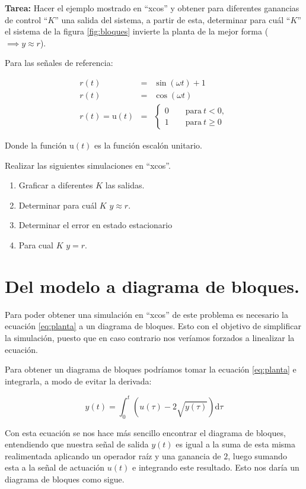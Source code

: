 \documentclass[11pt,a4paper]{article}
\begin{document}
\textbf{Tarea:} Hacer el ejemplo mostrado en ``xcos'' y obtener para diferentes ganancias de control ``$K$'' una salida del sistema, a partir de esta, determinar para cuál ``$K$'' el sistema de la figura \ref{fig:bloques} invierte la planta de la mejor forma ($\implies y \approx r$).

Para las señales de referencia:

\begin{eqnarray*}
		r(t) &=& \sin(\omega t) + 1\\
		r(t) &=& \cos(\omega t)\\
		r(t) = \mathrm{u}(t) &=&
		\begin{cases}
				0 \qquad \mathrm{para}~t < 0, \\
				1 \qquad \mathrm{para}~t \ge 0
		\end{cases}
\end{eqnarray*}


Donde la función $\mathrm{u} (t) $ es la función escalón unitario.

Realizar las siguientes simulaciones en ``xcos''.
\begin{enumerate}[label = \Roman*)]
		\item Graficar a diferentes $K$ las salidas.
		\item Determinar para cuál $K$ $y \approx r$.
		\item Determinar el error en estado estacionario
		\item Para cual $K$ $y = r$.
\end{enumerate}

\section{Del modelo a diagrama de bloques.}

Para poder obtener una simulación en ``xcos'' de este problema es necesario la ecuación \ref{eq:planta} a un diagrama de bloques. Esto con el objetivo de simplificar la simulación, puesto que en caso contrario nos veríamos forzados a linealizar la ecuación.

Para obtener un diagrama de bloques podríamos tomar la ecuación \ref{eq:planta} e integrarla, a modo de evitar la derivada:

\begin{equation}
		y(t) = \int_{0}^{t} \left(u(\tau) - 2\sqrt{y(\tau)}\right)\mathrm{d}\tau
\end{equation}

Con esta ecuación se nos hace más sencillo encontrar el diagrama de bloques, entendiendo que nuestra señal de salida $y(t)$ es igual a la suma de esta misma realimentada aplicando un operador raíz y una ganancia de $2$, luego sumando esta a la señal de actuación $u(t)$ e integrando este resultado. Esto nos daría un diagrama de bloques como sigue.
\end{document}

